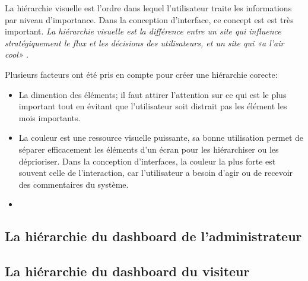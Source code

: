 La hiérarchie visuelle est l'ordre dans lequel l'utilisateur traite les informations par niveau d'importance.
Dans la conception d'interface, ce concept est est très important.
\textit{La hiérarchie visuelle est la différence entre un site qui influence stratégiquement le flux et les 
décisions des utilisateurs, et un site qui «a l'air cool» \cite{cao20155}.}
\par 
Plusieurs facteurs ont été pris en compte pour créer une hiérarchie corecte:
\begin{itemize}
    \item La dimention des éléments; il faut attirer l'attention sur ce qui est le plus important
    tout en évitant que l'utilisateur soit distrait pas les élément les mois importants.
    \item La couleur est une ressource visuelle puissante, sa bonne utilisation permet de séparer 
    efficacement les éléments d'un écran pour les hiérarchiser ou les déprioriser. Dans la 
    conception d’interfaces, la couleur la plus forte est souvent celle de l’interaction, 
    car l’utilisateur a besoin d’agir ou de recevoir des commentaires du système.
    \item 
\end{itemize}
\subsection{La hiérarchie du dashboard de l'administrateur}

\subsection{La hiérarchie du dashboard du visiteur}